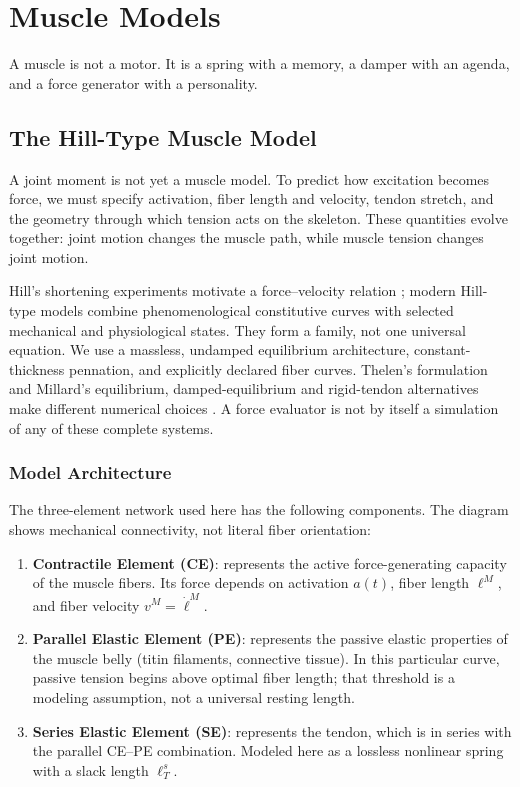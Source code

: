 \chapter{Muscle Models}
\label{ch:muscle-models}

\epigraph{%
  A muscle is not a motor. It is a spring with a memory,
  a damper with an agenda, and a force generator with a personality.
}{}

\section{The Hill-Type Muscle Model}

A joint moment is not yet a muscle model. To predict how excitation becomes
force, we must specify activation, fiber length and velocity, tendon stretch,
and the geometry through which tension acts on the skeleton. These quantities
evolve together: joint motion changes the muscle path, while muscle tension
changes joint motion.

Hill's shortening experiments motivate a force--velocity relation
\cite{Hill1938}; modern Hill-type models combine phenomenological constitutive
curves with selected mechanical and physiological states. They form a family,
not one universal equation. We use a massless, undamped equilibrium architecture,
constant-thickness pennation, and explicitly declared fiber curves.
Thelen's formulation and Millard's equilibrium, damped-equilibrium and
rigid-tendon alternatives make different numerical choices
\cite{Thelen2003,millard2013flexing}. A force evaluator is not by itself a
simulation of any of these complete systems.

\subsection{Model Architecture}

The three-element network used here has the following components.
The diagram shows mechanical connectivity, not literal fiber orientation:

\begin{enumerate}
  \item \textbf{Contractile Element (CE)}: represents the active force-generating
        capacity of the muscle fibers. Its force depends on activation $a(t)$, fiber
        length $\ell^M$, and fiber velocity $v^M = \dot{\ell}^M$.
  \item \textbf{Parallel Elastic Element (PE)}: represents the passive elastic
        properties of the muscle belly (titin filaments, connective tissue). In this particular curve, passive tension begins above optimal fiber length;
        that threshold is a modeling assumption, not a universal resting length.
  \item \textbf{Series Elastic Element (SE)}: represents the tendon, which is in
        series with the parallel CE--PE combination. Modeled here as a lossless nonlinear spring with a
        slack length $\ell_T^s$.
\end{enumerate}

